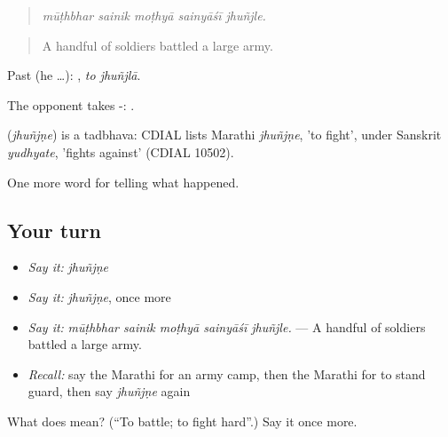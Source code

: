 \begin{quote}
\emph{mūṭhbhar sainik moṭhyā sainyāśī jhuñjle.}
\end{quote}

\begin{quote}
A handful of soldiers battled a large army.
\end{quote}

Past (he …):  , \emph{to jhuñjlā}.

The opponent takes -:  .

\begin{cousinweb}
\textbf{} (\emph{jhuñjṇe}) is a tadbhava: CDIAL lists Marathi \emph{jhuñjṇe}, 'to fight', under Sanskrit \emph{yudhyate}, 'fights against' (CDIAL 10502).
\end{cousinweb}

\begin{grammarlens}[title={What you've built}]
One more word for telling what happened.
\end{grammarlens}

\subsection*{Your turn}
\begin{itemize}
\raggedright
  \item \emph{Say it:} \emph{jhuñjṇe}
  \item \emph{Say it:} \emph{jhuñjṇe}, once more
  \item \emph{Say it:} \emph{mūṭhbhar sainik moṭhyā sainyāśī jhuñjle.} — A handful of soldiers battled a large army.
  \item \emph{Recall:} say the Marathi for an army camp, then the Marathi for to stand guard, then say \emph{jhuñjṇe} again
\end{itemize}

\begin{tcolorbox}[breakable,colback=teal!4,colframe=teal!35!black,title={Before you move on}]
What does  mean? (\textquotedblleft{}To battle; to fight hard\textquotedblright{}.) Say it once more.
\end{tcolorbox}
